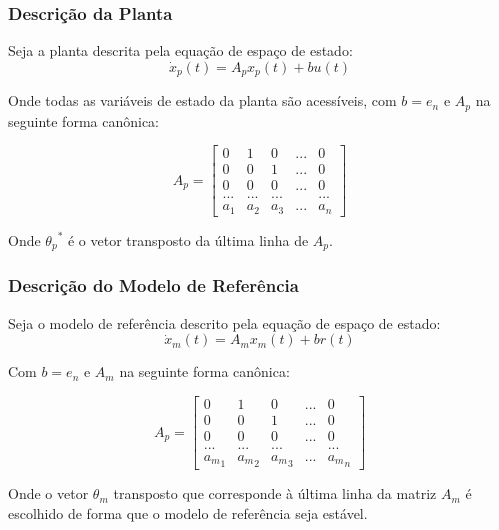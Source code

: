 \documentclass[aspectratio=169]{beamer}
\begin{document}
\begin{frame}
\frametitle{Descrição da Planta}

Seja a planta descrita pela equação de espaço de estado:
\begin{equation}
\dot{x}_p(t) = A_p x_p(t) + b u(t)
\end{equation}

Onde todas as variáveis de estado da planta são acessíveis, com $b=e_n$ e $A_p$ na seguinte forma canônica:

\[ 
A_p =
 \begin{bmatrix}
    0       & 1       &  0       &  ... &  0      \\
    0       & 0       &  1       &  ... &  0      \\
    0       & 0       &  0       &  ... &  0      \\
    ...     & ...     &  ...     &      &  ...    \\
    a_1     & a_2     &  a_3     &  ... &  a_n
  \end{bmatrix}
\]

Onde ${\theta_p}^*$ é o vetor transposto da última linha de $A_p$.  

\end{frame}

\begin{frame}
\frametitle{Descrição do Modelo de Referência}


Seja o modelo de referência descrito pela equação de espaço de estado:
\begin{equation}
\dot{x}_m(t) = A_m x_m(t) + b r(t)
\end{equation}

Com $b=e_n$ e $A_m$ na seguinte forma canônica:

\[ 
A_p =
 \begin{bmatrix}
    0       & 1       &  0       &  ... &  0      \\
    0       & 0       &  1       &  ... &  0      \\
    0       & 0       &  0       &  ... &  0      \\
    ...     & ...     &  ...     &      &  ...    \\
    {a_m}_1     & {a_m}_2     &  {a_m}_3     &  ... &  {a_m}_n
  \end{bmatrix}
\]

Onde o vetor $\theta_m$ transposto que corresponde à última linha da matriz $A_m$ é escolhido de forma que o modelo de referência seja estável.

\end{frame}
\end{document}
